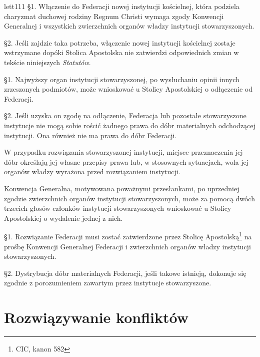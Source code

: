 

lett{111} \S{}1. Włączenie do Federacji nowej instytucji kościelnej, która podziela charyzmat duchowej rodziny Regnum Christi wymaga zgody Konwencji Generalnej i wszystkich zwierzchnich organów władzy instytucji stowarzyszonych.


\S{}2. Jeśli zajdzie taka potrzeba, włączenie nowej instytucji kościelnej zostaje wstrzymane dopóki Stolica Apostolska nie zatwierdzi odpowiednich zmian w tekście niniejszych {\em Statutów}.




\filbreak{}


 \S{}1. Najwyższy organ instytucji stowarzyszonej, po wysłuchaniu opinii innych zrzeszonych podmiotów, może wnioskować u Stolicy Apostolskiej o odłączenie od Federacji.


\S{}2. Jeśli uzyska on zgodę na odłączenie, Federacja lub pozostałe stowarzyszone instytucje nie mogą sobie rościć żadnego prawa do dóbr materialnych odchodzącej instytucji. Ona również nie ma prawa do dóbr Federacji.


 


 W przypadku rozwiązania stowarzyszonej instytucji, miejsce przeznaczenia jej dóbr określają jej własne przepisy prawa lub, w stosownych sytuacjach, wola jej organów władzy wyrażona przed rozwiązaniem instytucji.


 


 Konwencja Generalna, motywowana poważnymi przesłankami, po uprzedniej zgodzie zwierzchnich organów instytucji stowarzyszonych, może za pomocą dwóch trzecich głosów członków instytucji stowarzyszonych wnioskować u Stolicy Apostolskiej o wydalenie jednej z nich.


 


 \S{}1. Rozwiązanie Federacji musi zostać zatwierdzone przez Stolicę Apostolską\footnote{CIC, kanon 582} na prośbę Konwencji Generalnej Federacji i zwierzchnich organów władzy instytucji stowarzyszonych.


\S{}2. Dystrybucja dóbr materialnych Federacji, jeśli takowe istnieją, dokonuje się zgodnie z porozumieniem zawartym przez instytucje stowarzyszone.


\chapter{Rozwiązywanie konfliktów}


